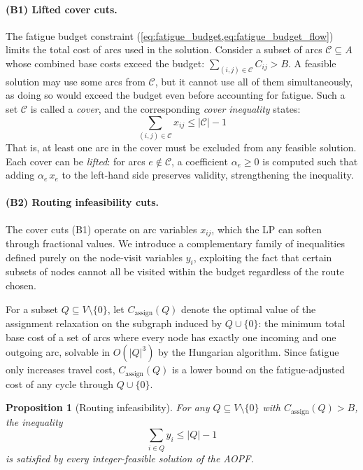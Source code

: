 \documentclass[11pt,a4paper]{article}
\newtheorem{proposition}{Proposition}
\begin{document}
\paragraph{(B1) Lifted cover cuts.}
The fatigue budget constraint (\cref{eq:fatigue_budget,eq:fatigue_budget_flow}) limits the total cost of arcs used in the solution.
Consider a subset of arcs $\mathcal{C} \subseteq A$ whose combined base costs exceed the budget: $\sum_{(i,j) \in \mathcal{C}} C_{ij} > B$.
A feasible solution may use some arcs from $\mathcal{C}$, but it cannot use all of them simultaneously, as doing so would exceed the budget even before accounting for fatigue.
Such a set $\mathcal{C}$ is called a \emph{cover}, and the corresponding \emph{cover inequality} states:
\begin{equation}
  \sum_{(i,j) \in \mathcal{C}} x_{ij} \leq |\mathcal{C}| - 1
  \label{eq:cover}
\end{equation}
That is, at least one arc in the cover must be excluded from any feasible solution.
Each cover can be \emph{lifted}: for arcs $e \notin \mathcal{C}$, a coefficient $\alpha_e \geq 0$ is computed such that adding $\alpha_e\, x_e$ to the left-hand side preserves validity, strengthening the inequality.

\paragraph{(B2) Routing infeasibility cuts.}
The cover cuts (B1) operate on arc variables $x_{ij}$, which the LP can soften through fractional values.
We introduce a complementary family of inequalities defined purely on the node-visit variables $y_i$, exploiting the fact that certain subsets of nodes cannot all be visited within the budget regardless of the route chosen.

For a subset $Q \subseteq V \setminus \{0\}$, let $C_{\text{assign}}(Q)$ denote the optimal value of the assignment relaxation on the subgraph induced by $Q \cup \{0\}$: the minimum total base cost of a set of arcs where every node has exactly one incoming and one outgoing arc, solvable in $O(|Q|^3)$ by the Hungarian algorithm.
Since fatigue only increases travel cost, $C_{\text{assign}}(Q)$ is a lower bound on the fatigue-adjusted cost of any cycle through $Q \cup \{0\}$.

\begin{proposition}[Routing infeasibility]
\label{prop:routing}
For any $Q \subseteq V \setminus \{0\}$ with $C_{\text{assign}}(Q) > B$, the inequality
\begin{equation}
  \sum_{i \in Q} y_i \leq |Q| - 1
  \label{eq:routing_infeasibility}
\end{equation}
is satisfied by every integer-feasible solution of the AOPF\@.
\end{proposition}
\end{document}
